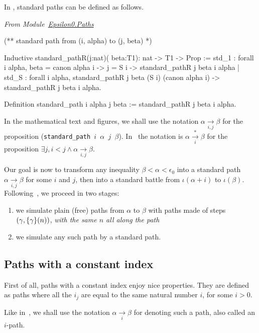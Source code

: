 In \coq{}, standard paths can be defined as follows.

\vspace{4pt}
\emph{From
Module~\href{../theories/html/hydras.Epsilon0.Paths.html}{Epsilon0.Paths}}

\begin{Coqsrc}
(**  standard path from (i, alpha) to (j, beta) *)

Inductive standard_pathR(j:nat)( beta:T1):  nat -> T1 -> Prop :=
  std_1 : forall i alpha, 
       beta = canon alpha i -> j = S i ->
       standard_pathR j beta i  alpha
| std_S : forall i alpha, 
      standard_pathR j beta (S i) (canon alpha i)  ->
      standard_pathR j beta i alpha.

Definition standard_path  i alpha j beta := 
   standard_pathR j beta i alpha.
\end{Coqsrc}

In the mathematical text and figures, we shall use the notation 
$\alpha \xrightarrow[i,j]{}\beta$ for the proposition 
(\texttt{standard\_path $i$ $\alpha$ $j$ $\beta$}).
In~\cite{KS81} the notation is
$\alpha \xrightarrow[i]{*}\beta$
for 
the proposition  $\exists j, i<j \wedge \alpha \xrightarrow[i,j]{} \beta$.



Our goal is now  to transform any inequality $\beta<\alpha<\epsilon_0$ into a standard path $\alpha \xrightarrow[i,j]{} \beta$ for some $i$ and $j$, then into a standard battle
from $\iota(\alpha+i)$ to $\iota(\beta)$. 
Following~\cite{KS81}, we proceed in two stages:
\begin{enumerate}
\item we simulate plain (free) paths from $\alpha$ to $\beta$ with
paths made of steps $(\gamma,\mbox{$\{\gamma\}(n)$})$, \emph{with the same $n$ all along the path}
\item we simulate any such path by a standard path.
\end{enumerate}



\subsection{Paths with a constant index}

First of all, paths with a constant index 
enjoy nice properties. They are defined as paths where all the $i_j$ are equal to the same natural number $i$, for some $i>0$. 


Like in~\cite{KS81}, we shall use the notation $\alpha \xrightarrow[i]{} \beta$ for denoting such a path, also called an $i$-path.

